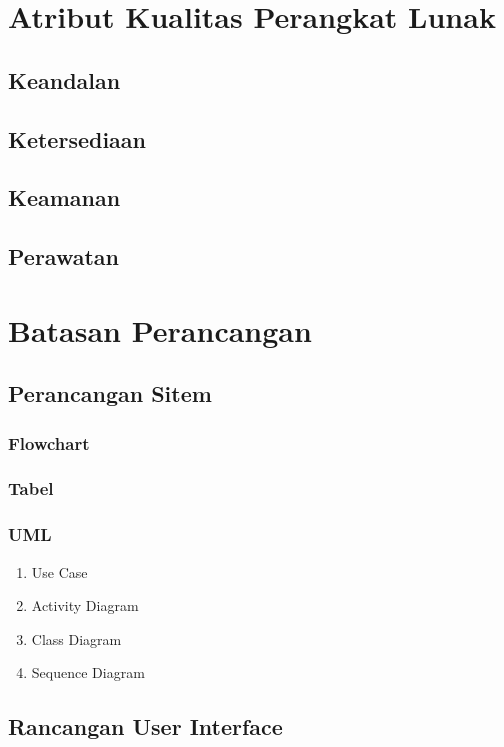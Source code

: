 \documentclass{scrreprt}
\begin{document}
\section{Atribut Kualitas Perangkat Lunak}

	\subsection{Keandalan}
	\blindtext[1]
	
	\subsection{Ketersediaan}
	\blindtext[1]
	
	\subsection{Keamanan}
	\blindtext[1]
	
	\subsection{Perawatan}
	\blindtext[1]
	
	
\section{Batasan Perancangan}

\blindtext[1]
	
	\subsection{Perancangan Sitem}
	\blindtext[1]
	
		\subsubsection{Flowchart}
		
		
		\subsubsection{Tabel}
		
		
		\subsubsection{UML}
		
		\begin{enumerate}
			\item Use Case
			\item Activity Diagram
			\item Class Diagram
			\item Sequence Diagram
		\end{enumerate}
	
	\subsection{Rancangan User Interface}

	
\end{document}
